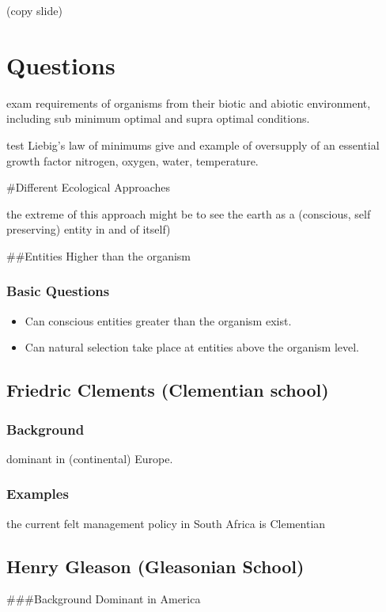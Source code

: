 \documentclass[]{article}
\providecommand{\tightlist}{%
  \setlength{\itemsep}{0pt}\setlength{\parskip}{0pt}}
\begin{document}
(copy slide)

\hypertarget{questions}{%
\section{Questions}\label{questions}}

exam requirements of organisms from their biotic and abiotic
environment, including sub minimum optimal and supra optimal conditions.

test Liebig's law of minimums give and example of oversupply of an
essential growth factor nitrogen, oxygen, water, temperature.

\#Different Ecological Approaches

the extreme of this approach might be to see the earth as a (conscious,
self preserving) entity in and of itself)

\#\#Entities Higher than the organism

\hypertarget{basic-questions}{%
\subsubsection{Basic Questions}\label{basic-questions}}

\begin{itemize}
\tightlist
\item
  Can conscious entities greater than the organism exist.
\item
  Can natural selection take place at entities above the organism level.
\end{itemize}

\hypertarget{friedric-clements-clementian-school}{%
\subsection{Friedric Clements (Clementian
school)}\label{friedric-clements-clementian-school}}

\hypertarget{background-1}{%
\subsubsection{Background}\label{background-1}}

dominant in (continental) Europe.

\hypertarget{examples}{%
\subsubsection{Examples}\label{examples}}

the current felt management policy in South Africa is Clementian

\hypertarget{henry-gleason-gleasonian-school}{%
\subsection{Henry Gleason (Gleasonian
School)}\label{henry-gleason-gleasonian-school}}

\#\#\#Background Dominant in America
\end{document}
